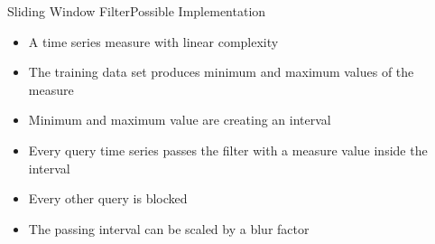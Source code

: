 \begin{frame}{Sliding Window Filter}{Possible Implementation}
    \begin{itemize}
        \item A time series measure with linear complexity

        \item The training data set produces minimum and maximum values of the measure

        \item Minimum and maximum value are creating an interval

        \item Every query time series passes the filter with a measure value inside the interval

        \item Every other query is blocked

        \item The passing interval can be scaled by a blur factor
    \end{itemize}
\end{frame}

